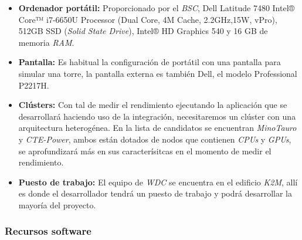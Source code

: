 \begin{itemize}

 \item \textbf{Ordenador portátil:} Proporcionado por el \textit{BSC}, Dell Latitude 7480 Intel® Core™ i7-6650U Processor (Dual Core, 4M Cache, 2.2GHz,15W, vPro), 512GB SSD (\textit{Solid State Drive}), Intel® HD Graphics 540 y 16 GB de memoria \textit{RAM}.
 
 \item \textbf{Pantalla:} Es habitual la configuración de portátil con una pantalla para simular una torre, la pantalla externa es también Dell, el modelo Professional P2217H.
 
 \item \textbf{Clústers:} Con tal de medir el rendimiento ejecutando la aplicación que se desarrollará haciendo uso de la integración, necesitaremos un clúster con una arquitectura heterogénea. En la lista de candidatos se encuentran \textit{MinoTauro} y \textit{CTE-Power}, ambos están dotados de nodos que contienen \textit{CPUs} y \textit{GPUs}, se aprofundizará más en sus caracterísitcas en el momento de medir el rendimiento.
 
 \item \textbf{Puesto de trabajo:} El equipo de \textit{WDC} se encuentra en el edificio \textit{K2M}, allí es donde el desarrollador tendrá un puesto de trabajo y podrá desarrollar la mayoría del proyecto.
 
\end{itemize}

\subsubsection{Recursos software}

